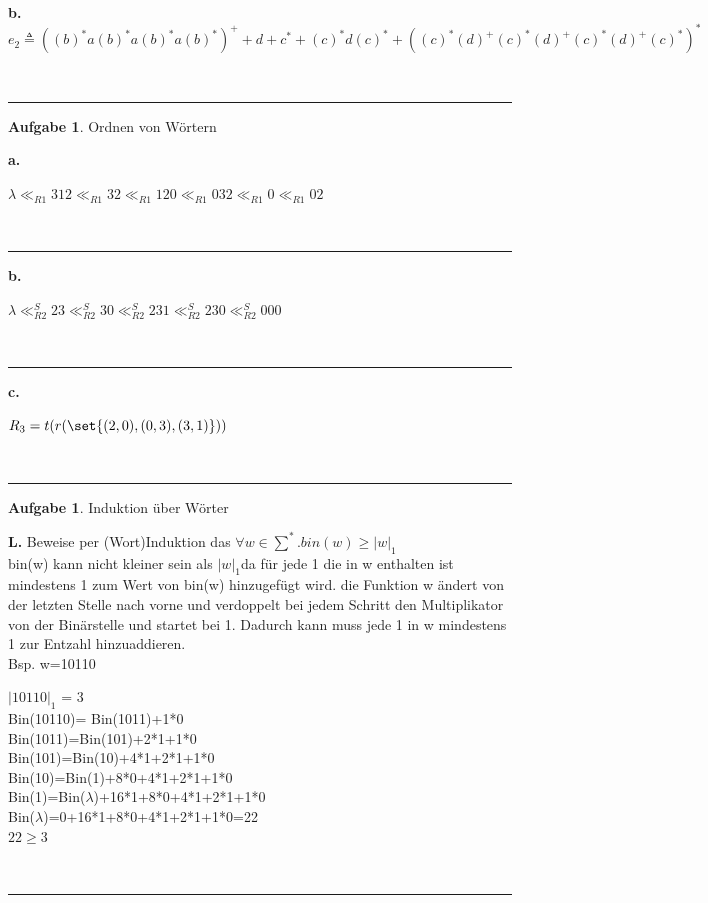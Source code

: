 \documentclass[10pt,leqno ]{article}
\DeclarePairedDelimiter\set\{\}
\theoremstyle{definition}
\newtheorem{problem}[theorem]{Aufgabe}
\newenvironment{solution}[1][L]{\begin{doublespace}\textbf{#1.}\quad }{\ \rule{0.5em}{0.5em}\end{doublespace}}
\begin{document}
\begin{solution}[b]
\(e_2 \triangleq ((b)^*a(b)^*a(b)^*a(b)^*)^+ + d + c^* + (c)^*d(c)^* + ((c)^*(d)^+(c)^*(d)^+(c)^*(d)^+(c)^*)^*\)


\end{solution}

\begin{problem}
Ordnen von Wörtern
\end{problem}
\begin{solution}[a]

\(\lambda \ll_{R1} 312 \ll_{R1} 32 \ll_{R1} 120 \ll_{R1} 032 \ll_{R1} 0 \ll_{R1} 02 \)


\end{solution}
\begin{solution}[b]

\( \lambda \ll_{R2}^S 23 \ll_{R2}^S 30 \ll_{R2}^S 231 \ll_{R2}^S 230 \ll_{R2}^S 000 \)



\end{solution}
\begin{solution}[c]

\( R_3 = t(r(\set{(2,0),(0,3),(3,1)})) \)


\end{solution}
\pagebreak
\begin{problem}
    Induktion über Wörter
\end{problem}

\begin{solution}
Beweise per (Wort)Induktion das \( \forall w \in \sum^* . bin(w) \geq \vert w \vert_1 \) \\

bin(w) kann nicht kleiner sein als \(\vert w \vert_1 \)da für jede 1 die in w enthalten ist mindestens 1 zum Wert von bin(w) hinzugefügt wird. die Funktion w ändert von der letzten Stelle nach vorne und verdoppelt bei jedem Schritt den Multiplikator von der Binärstelle und startet bei 1. Dadurch kann muss jede 1 in w mindestens 1 zur Entzahl hinzuaddieren.\\
Bsp. w=10110 

\(\vert 10110 \vert_1 \) = 3\\
Bin(10110)= Bin(1011)+1*0\\
Bin(1011)=Bin(101)+2*1+1*0\\
Bin(101)=Bin(10)+4*1+2*1+1*0\\
Bin(10)=Bin(1)+8*0+4*1+2*1+1*0\\
Bin(1)=Bin(\(\lambda\))+16*1+8*0+4*1+2*1+1*0\\
Bin(\(\lambda\))=0+16*1+8*0+4*1+2*1+1*0=22\\
$22\geq 3$


\end{solution}
\end{document}
